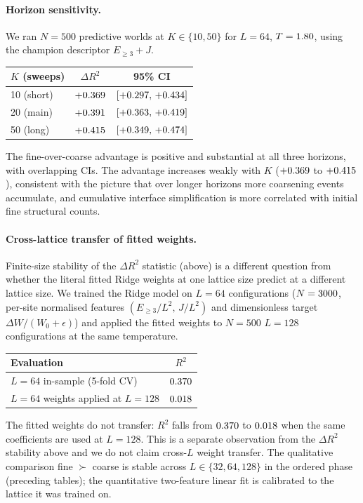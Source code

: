 \documentclass[aps,pre,preprint,superscriptaddress,showpacs]{revtex4-2}
\begin{document}
\paragraph{Horizon sensitivity.}
We ran $N=500$ predictive worlds at $K\in\{10,50\}$ for $L=64$,
$T=1.80$, using the champion descriptor $E_{\geq 3}+J$.
\begin{center}
\begin{tabular}{lcc}
\toprule
$K$ (sweeps) & $\Delta R^2$ & 95\% CI \\
\midrule
10 (short)  & $+0.369$   & $[+0.297,\,+0.434]$   \\
20 (main)   & $+0.391$   & $[+0.363,\,+0.419]$   \\
50 (long)   & $+0.415$ & $[+0.349,\,+0.474]$ \\
\bottomrule
\end{tabular}
\end{center}
The fine-over-coarse advantage is positive and substantial at all
three horizons, with overlapping CIs.
The advantage increases weakly with $K$ ($+0.369$ to
$+0.415$), consistent with the picture that over longer
horizons more coarsening events accumulate, and cumulative
interface simplification is more correlated with initial fine
structural counts.

\paragraph{Cross-lattice transfer of fitted weights.}
Finite-size stability of the $\Delta R^2$ statistic (above) is a
different question from whether the literal fitted Ridge weights at one
lattice size predict at a different lattice size.
We trained the Ridge model on $L=64$ configurations
($N=3000$, per-site normalised features
$(E_{\geq 3}/L^2,\, J/L^2)$ and dimensionless target
$\Delta W/(W_0+\epsilon)$) and applied the fitted weights to $N=500$
$L=128$ configurations at the same temperature.
\begin{center}
\begin{tabular}{lc}
\toprule
Evaluation & $R^2$ \\
\midrule
$L=64$ in-sample (5-fold CV) & $0.370$ \\
$L=64$ weights applied at $L=128$ & $0.018$ \\
\bottomrule
\end{tabular}
\end{center}
The fitted weights do not transfer: $R^2$ falls from
$0.370$ to $0.018$ when the same coefficients are used at
$L=128$.
This is a separate observation from the $\Delta R^2$ stability above
and we do not claim cross-$L$ weight transfer.
The qualitative comparison fine $\succ$ coarse is stable across
$L\in\{32,64,128\}$ in the ordered phase (preceding tables); the
quantitative two-feature linear fit is calibrated to the lattice it was
trained on.
\end{document}
